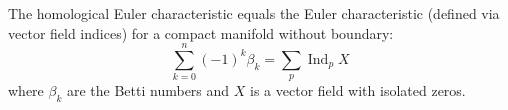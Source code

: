 The homological Euler characteristic equals the Euler characteristic (defined via vector field indices) for a compact manifold without boundary:
$$\sum_{k=0}^{n} (-1)^k \beta_k = \sum_{p} \operatorname{Ind}_p X$$
where $\beta_k$ are the Betti numbers and $X$ is a vector field with isolated zeros.
